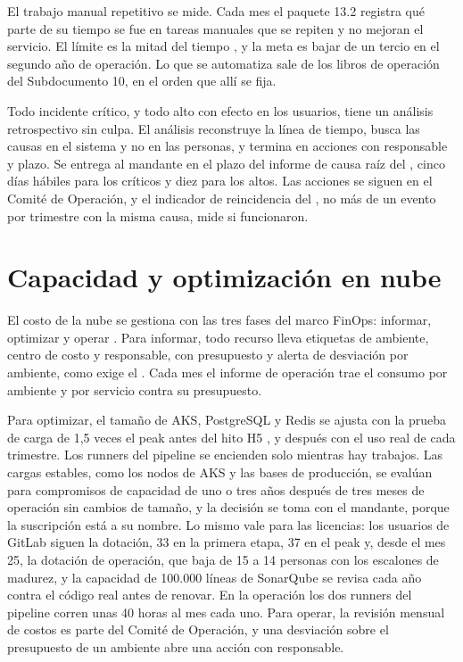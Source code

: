 El trabajo manual repetitivo se mide. Cada mes el paquete 13.2 registra qué parte de su tiempo se fue en
tareas manuales que se repiten y no mejoran el servicio. El límite es la mitad del tiempo
\parencite{beyer2016}, y la meta es bajar de un tercio en el segundo año de operación. Lo que se
automatiza sale de los libros de operación del Subdocumento 10, en el orden que allí se fija.

Todo incidente crítico, y todo alto con efecto en los usuarios, tiene un análisis retrospectivo sin
culpa. El análisis reconstruye la línea de tiempo, busca las causas en el sistema y no en las personas,
y termina en acciones con responsable y plazo. Se entrega al mandante en el plazo del informe de causa
raíz del , cinco días hábiles para los críticos y diez para los altos. Las acciones se
siguen en el Comité de Operación, y el indicador de reincidencia del , no más de un evento
por trimestre con la misma causa, mide si funcionaron.

\section{Capacidad y optimización en nube}\label{sec:11-capacidad-y-optimizacion-en-nube}

El costo de la nube se gestiona con las tres fases del marco FinOps: informar, optimizar y operar
\parencite{finops_framework}. Para informar, todo recurso lleva etiquetas de ambiente, centro de costo y
responsable, con presupuesto y alerta de desviación por ambiente, como exige el . Cada mes
el informe de operación trae el consumo por ambiente y por servicio contra su presupuesto.

Para optimizar, el tamaño de AKS, PostgreSQL y Redis se ajusta con la prueba de carga de 1,5 veces el
peak antes del hito H5 , y después con el uso real de cada trimestre. Los runners
del pipeline se encienden solo mientras hay trabajos. Las cargas estables, como los nodos de AKS y las
bases de producción, se evalúan para compromisos de capacidad de uno o tres años después de tres meses
de operación sin cambios de tamaño, y la decisión se toma con el mandante, porque la suscripción está a
su nombre. Lo mismo vale para las licencias: los usuarios de GitLab siguen la dotación, 33 en la
primera etapa, 37 en el peak y, desde el mes 25, la dotación de operación, que baja de 15 a 14 personas
con los escalones de madurez, y la capacidad de 100.000 líneas de SonarQube se
revisa cada año contra el código real antes de renovar. En la operación los dos runners del pipeline
corren unas 40 horas al mes cada uno. Para operar, la revisión mensual de costos es parte del Comité de
Operación, y una desviación sobre el presupuesto de un ambiente abre una acción con responsable.

